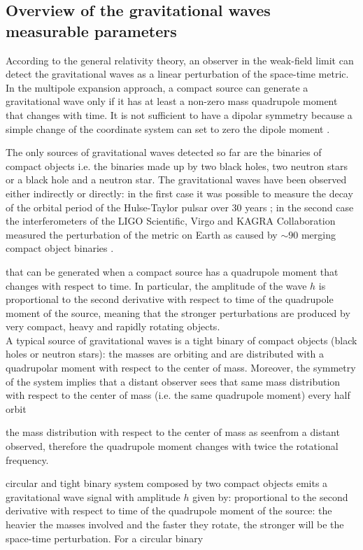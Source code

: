 \documentclass[a4paper,titlepage]{book}     	%
\begin{document}
\subsection{Overview of the gravitational waves measurable parameters}
According to the general relativity theory, an observer in the weak-field limit can detect the gravitational waves as a linear perturbation of the space-time metric. In the multipole expansion approach, a compact source can generate a gravitational wave only if it has at least a non-zero mass quadrupole moment that changes with time. It is not sufficient to have a dipolar symmetry because a simple change of the coordinate system can set to zero the dipole moment \cite{MaggioreGW}.

The only sources of gravitational waves detected so far are the binaries of compact objects i.e. the binaries made up by two black holes, two neutron stars or a black hole and a neutron star. The gravitational waves have been observed either indirectly or directly: in the first case it was possible to measure the decay of the orbital period of the Hulse-Taylor pulsar over 30 years \cite{HTpulsar2005GWdecay}; in the second case the interferometers of the LIGO Scientific, Virgo and KAGRA Collaboration measured the perturbation of the metric on Earth as caused by $\sim 90$ merging compact object binaries \cite{GWTC-3}. 



 that can be generated when a compact source has a quadrupole moment that changes with respect to time. In particular, the amplitude of the wave $h$ is proportional to the second derivative with respect to time of the quadrupole moment of the source, meaning that the stronger perturbations are produced by very compact, heavy and rapidly rotating objects. \\

A typical source of gravitational waves is a tight binary of compact objects (black holes or neutron stars): the masses are orbiting and are distributed with a quadrupolar moment with respect to the center of mass. Moreover, the symmetry of the system implies that a distant observer sees that same mass distribution with respect to the center of mass (i.e. the same quadrupole moment) every half orbit

the mass distribution with respect to the center of mass as seenfrom a distant observed, therefore the quadrupole moment changes with twice the rotational frequency. 

 circular and tight binary system composed by two compact objects  emits a gravitational wave signal with amplitude $h$ given by: proportional to the second derivative with respect to time of the quadrupole moment of the source: the heavier the masses involved and the faster they rotate, the stronger will be the space-time perturbation. For a circular binary
\end{document}
